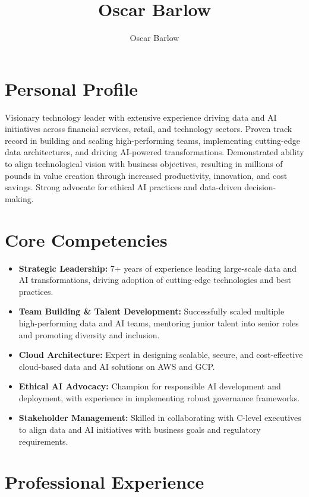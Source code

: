 \documentclass[a4paper]{scrartcl}
\author{Oscar Barlow}
\title{Oscar Barlow}
\date{}
\begin{document}
\maketitle

\section*{Personal Profile}
 { %
  \setlength{\parskip}{6pt plus 2pt minus 1pt}
  Visionary technology leader with extensive experience driving data and AI initiatives across financial services, retail, and technology sectors. Proven track record in building and scaling high-performing teams, implementing cutting-edge data architectures, and driving AI-powered transformations. Demonstrated ability to align technological vision with business objectives, resulting in millions of pounds in value creation through increased productivity, innovation, and cost savings. Strong advocate for ethical AI practices and data-driven decision-making.
 } %

\section*{Core Competencies}
\begin{itemize}
	\item \textbf{Strategic Leadership:} 7+ years of experience leading large-scale data and AI transformations, driving adoption of cutting-edge technologies and best practices.
	\item \textbf{Team Building \& Talent Development:} Successfully scaled multiple high-performing data and AI teams, mentoring junior talent into senior roles and promoting diversity and inclusion.
	\item \textbf{Cloud Architecture:} Expert in designing scalable, secure, and cost-effective cloud-based data and AI solutions on AWS and GCP.
	\item \textbf{Ethical AI Advocacy:} Champion for responsible AI development and deployment, with experience in implementing robust governance frameworks.
	\item \textbf{Stakeholder Management:} Skilled in collaborating with C-level executives to align data and AI initiatives with business goals and regulatory requirements.
\end{itemize}

\section*{Professional Experience}
\end{document}
